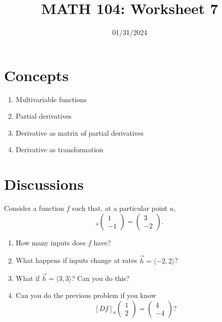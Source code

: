 \documentclass[12pt]{amsart}
\title{ MATH 104: Worksheet 7}
\author{}
\date{01/31/2024}
\begin{document}
\maketitle

\section{Concepts}

\begin{enumerate}
    \item Multivariable functions
    \item Partial derivatives
    \item Derivative as matrix of partial derivatives
    \item Derivative as transformation
\end{enumerate}

\section{Discussions}

\begin{question}
    Consider a function $f$ such that, at a particular point $a$,
    \begin{equation*}
        [Df]_a\begin{pmatrix}
            1 \\ -1
        \end{pmatrix}
        = \begin{pmatrix}
            3 \\ -2
        \end{pmatrix}.
    \end{equation*}
    \begin{enumerate}
        \item How many inputs does $f$ have?
        \item What happens if inputs change at rates $\vec{h} = \langle -2, 2 \rangle$?
        \item What if $\vec{h} = \langle 3, 3 \rangle$? Can you do this?
        \item Can you do the previous problem if you know 
            $$[Df]_a \begin{pmatrix}
                1 \\2 
            \end{pmatrix}
            = 
            \begin{pmatrix}
                4 \\ -4
            \end{pmatrix}?
            $$
    \end{enumerate}
\end{question}
\end{document}
